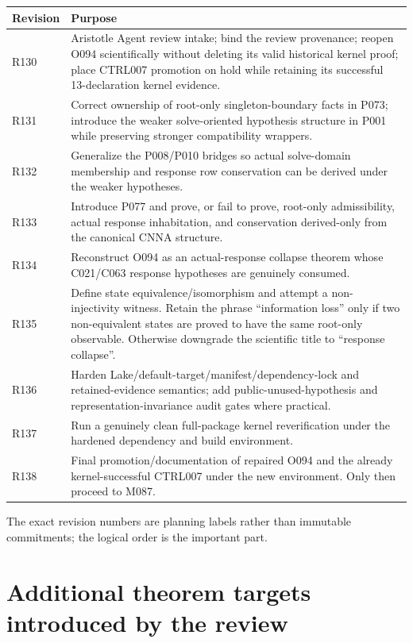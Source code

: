 \documentclass[11pt,a4paper]{article}
\begin{document}
\begin{longtable}{@{}p{1.5cm}p{12.7cm}@{}}
\toprule
\textbf{Revision} & \textbf{Purpose} \\
\midrule
\endhead
R130 & Aristotle Agent review intake; bind the review provenance; reopen O094 scientifically without deleting its valid historical kernel proof; place CTRL007 promotion on hold while retaining its successful 13-declaration kernel evidence. \\
R131 & Correct ownership of root-only singleton-boundary facts in P073; introduce the weaker solve-oriented hypothesis structure in P001 while preserving stronger compatibility wrappers. \\
R132 & Generalize the P008/P010 bridges so actual solve-domain membership and response row conservation can be derived under the weaker hypotheses. \\
R133 & Introduce P077 and prove, or fail to prove, root-only admissibility, actual response inhabitation, and conservation derived-only from the canonical CNNA structure. \\
R134 & Reconstruct O094 as an actual-response collapse theorem whose C021/C063 response hypotheses are genuinely consumed. \\
R135 & Define state equivalence/isomorphism and attempt a non-injectivity witness. Retain the phrase ``information loss'' only if two non-equivalent states are proved to have the same root-only observable. Otherwise downgrade the scientific title to ``response collapse''. \\
R136 & Harden Lake/default-target/manifest/dependency-lock and retained-evidence semantics; add public-unused-hypothesis and representation-invariance audit gates where practical. \\
R137 & Run a genuinely clean full-package kernel reverification under the hardened dependency and build environment. \\
R138 & Final promotion/documentation of repaired O094 and the already kernel-successful CTRL007 under the new environment. Only then proceed to M087. \\
\bottomrule
\end{longtable}

The exact revision numbers are planning labels rather than immutable commitments; the logical order is the important part.

\section{Additional theorem targets introduced by the review}
\end{document}
